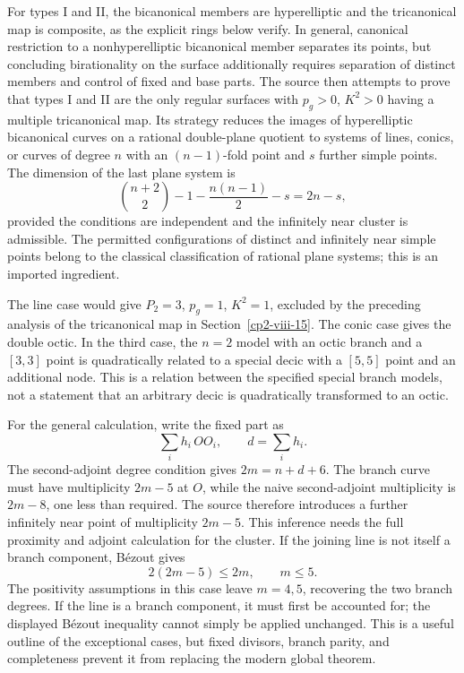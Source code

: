 For types I and II, the bicanonical members are hyperelliptic and the tricanonical map is composite, as the explicit rings below verify. In general, canonical restriction to a nonhyperelliptic bicanonical member separates its points, but concluding birationality on the surface additionally requires separation of distinct members and control of fixed and base parts. The source then attempts to prove that types I and II are the only regular surfaces with \(p_g>0\), \(K^2>0\) having a multiple tricanonical map. Its strategy reduces the images of hyperelliptic bicanonical curves on a rational double-plane quotient to systems of lines, conics, or curves of degree \(n\) with an \((n-1)\)-fold point and \(s\) further simple points. The dimension of the last plane system is
\[
\binom{n+2}{2}-1-\frac{n(n-1)}2-s=2n-s,
\]
provided the conditions are independent and the infinitely near cluster is admissible. The permitted configurations of distinct and infinitely near simple points belong to the classical classification of rational plane systems; this is an imported ingredient.

The line case would give \(P_2=3\), \(p_g=1\), \(K^2=1\), excluded by the preceding analysis of the tricanonical map in Section~\ref{cp2-viii-15}. The conic case gives the double octic. In the third case, the \(n=2\) model with an octic branch and a \([3,3]\) point is quadratically related to a special decic with a \([5,5]\) point and an additional node. This is a relation between the specified special branch models, not a statement that an arbitrary decic is quadratically transformed to an octic.

For the general calculation, write the fixed part as
\[
\sum_i h_i\,OO_i,\qquad d=\sum_i h_i.
\]
The second-adjoint degree condition gives \(2m=n+d+6\). The branch curve must have multiplicity \(2m-5\) at \(O\), while the naive second-adjoint multiplicity is \(2m-8\), one less than required. The source therefore introduces a further infinitely near point of multiplicity \(2m-5\). This inference needs the full proximity and adjoint calculation for the cluster. If the joining line is not itself a branch component, Bézout gives
\[
2(2m-5)\leq2m,\qquad m\leq5.
\]
The positivity assumptions in this case leave \(m=4,5\), recovering the two branch degrees. If the line is a branch component, it must first be accounted for; the displayed Bézout inequality cannot simply be applied unchanged. This is a useful outline of the exceptional cases, but fixed divisors, branch parity, and completeness prevent it from replacing the modern global theorem.

